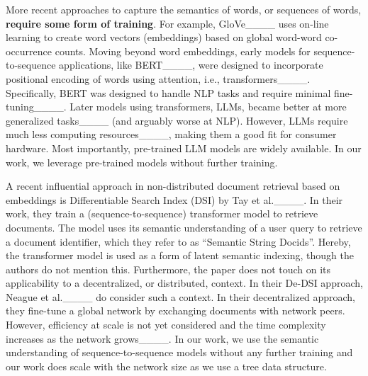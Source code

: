 More recent approaches to capture the semantics of words, or sequences of words, \textbf{require some form of training}.
For example, GloVe____ uses on-line learning to create word vectors (embeddings) based on global word-word co-occurrence counts.
Moving beyond word embeddings, early models for sequence-to-sequence applications, like BERT____, were designed to incorporate positional encoding of words using attention, i.e., transformers____.
Specifically, BERT was designed to handle NLP tasks and require minimal fine-tuning____.
Later models using transformers, LLMs, became better at more generalized tasks____ (and arguably worse at NLP).
However, LLMs require much less computing resources____, making them a good fit for consumer hardware.
Most importantly, pre-trained LLM models are widely available.
In our work, we leverage pre-trained models without further training.

A recent influential approach in non-distributed document retrieval based on embeddings is Differentiable Search Index (DSI) by Tay et al.____.
In their work, they train a (sequence-to-sequence) transformer model to retrieve documents.
The model uses its semantic understanding of a user query to retrieve a document identifier, which they refer to as ``Semantic String Docids''.
Hereby, the transformer model is used as a form of latent semantic indexing, though the authors do not mention this.
Furthermore, the paper does not touch on its applicability to a decentralized, or distributed, context.
In their De-DSI approach, Neague et al.____ do consider such a context.
In their decentralized approach, they fine-tune a global network by exchanging documents with network peers.
However, efficiency at scale is not yet considered and the time complexity increases as the network grows____.
In our work, we use the semantic understanding of sequence-to-sequence models without any further training and our work does scale with the network size as we use a tree data structure.



